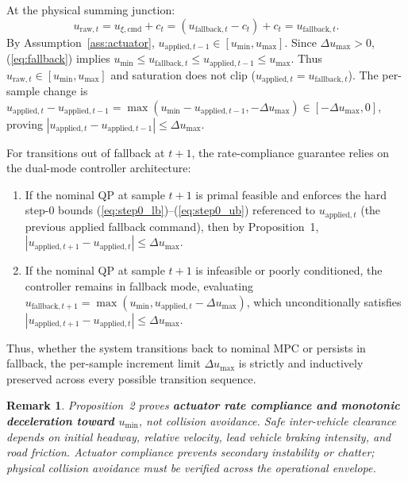 \documentclass[journal]{IEEEtran}
\newtheorem{remark}{Remark}
\begin{document}
\begin{IEEEproof}
At the physical summing junction:
\begin{equation}
u_{\mathrm{raw},t} = u_{\xi,\mathrm{cmd}} + c_t = (u_{\mathrm{fallback},t} - c_t) + c_t = u_{\mathrm{fallback},t}.
\end{equation}
By Assumption~\ref{ass:actuator}, $u_{\mathrm{applied},t-1} \in [u_{\min}, u_{\max}]$. Since $\Delta u_{\max} > 0$, (\ref{eq:fallback}) implies $u_{\min} \le u_{\mathrm{fallback},t} \le u_{\mathrm{applied},t-1} \le u_{\max}$. Thus $u_{\mathrm{raw},t} \in [u_{\min}, u_{\max}]$ and saturation does not clip ($u_{\mathrm{applied},t} = u_{\mathrm{fallback},t}$). The per-sample change is $u_{\mathrm{applied},t} - u_{\mathrm{applied},t-1} = \max(u_{\min} - u_{\mathrm{applied},t-1}, -\Delta u_{\max}) \in [-\Delta u_{\max}, 0]$, proving $|u_{\mathrm{applied},t} - u_{\mathrm{applied},t-1}| \le \Delta u_{\max}$.

For transitions out of fallback at $t+1$, the rate-compliance guarantee relies on the dual-mode controller architecture:
\begin{enumerate}
    \item If the nominal QP at sample $t+1$ is primal feasible and enforces the hard step-0 bounds (\ref{eq:step0_lb})--(\ref{eq:step0_ub}) referenced to $u_{\mathrm{applied},t}$ (the previous applied fallback command), then by Proposition~1, $|u_{\mathrm{applied},t+1} - u_{\mathrm{applied},t}| \le \Delta u_{\max}$.
    \item If the nominal QP at sample $t+1$ is infeasible or poorly conditioned, the controller remains in fallback mode, evaluating $u_{\mathrm{fallback},t+1} = \max(u_{\min}, u_{\mathrm{applied},t} - \Delta u_{\max})$, which unconditionally satisfies $|u_{\mathrm{applied},t+1} - u_{\mathrm{applied},t}| \le \Delta u_{\max}$.
\end{enumerate}
Thus, whether the system transitions back to nominal MPC or persists in fallback, the per-sample increment limit $\Delta u_{\max}$ is strictly and inductively preserved across every possible transition sequence.
\end{IEEEproof}

\begin{remark}
Proposition~2 proves \textbf{actuator rate compliance and monotonic deceleration toward $u_{\min}$}, not collision avoidance. Safe inter-vehicle clearance depends on initial headway, relative velocity, lead vehicle braking intensity, and road friction. Actuator compliance prevents secondary instability or chatter; physical collision avoidance must be verified across the operational envelope.
\end{remark}
\end{document}
